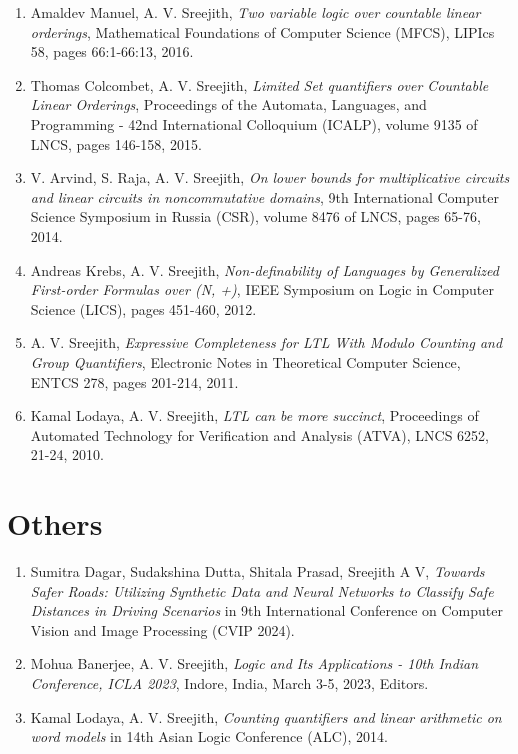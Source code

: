\documentclass[11pt,a4paper,sans]{moderncv} %
\begin{document}
\begin{enumerate}
\item Amaldev Manuel, A. V. Sreejith, \emph{Two variable logic over countable linear orderings}, Mathematical Foundations of Computer Science (MFCS), LIPIcs 58, pages 66:1-66:13, 2016.
\item Thomas Colcombet, A. V. Sreejith, \emph{Limited Set quantifiers over Countable Linear Orderings}, Proceedings of the Automata, Languages, and Programming - 42nd International Colloquium (ICALP), volume 9135 of LNCS, pages 146-158, 2015.
\item V. Arvind, S. Raja, A. V. Sreejith, \emph{On lower bounds for multiplicative circuits and linear circuits in noncommutative domains}, 9th International Computer Science Symposium in Russia (CSR), volume 8476 of LNCS, pages 65-76, 2014.
\item Andreas Krebs, A. V. Sreejith, \emph{Non-definability of Languages by Generalized First-order Formulas over (N, +)}, IEEE Symposium on Logic in Computer Science (LICS),  pages 451-460, 2012.
\item A. V. Sreejith, \emph{Expressive Completeness for LTL With Modulo Counting and Group Quantifiers}, Electronic Notes in Theoretical Computer Science, ENTCS 278, pages 201-214, 2011.
\item Kamal Lodaya, A. V. Sreejith, \emph{LTL can be more succinct}, Proceedings of Automated Technology for Verification and Analysis (ATVA), LNCS 6252, 21-24, 2010.
\end{enumerate}

\section{Others}
\begin{enumerate}
\item Sumitra Dagar, Sudakshina Dutta, Shitala Prasad, Sreejith A V, \emph{Towards Safer Roads: Utilizing Synthetic Data and Neural Networks to Classify Safe Distances in Driving Scenarios} in 9th International Conference on Computer Vision and Image Processing (CVIP 2024).
\item Mohua Banerjee, A. V. Sreejith, \emph{Logic and Its Applications - 10th Indian Conference, ICLA 2023}, Indore, India, March 3-5, 2023, Editors.
\item Kamal Lodaya, A. V. Sreejith, \emph{Counting quantifiers and linear arithmetic on word models} in 14th Asian Logic Conference (ALC), 2014.
\end{enumerate}
\end{document}
